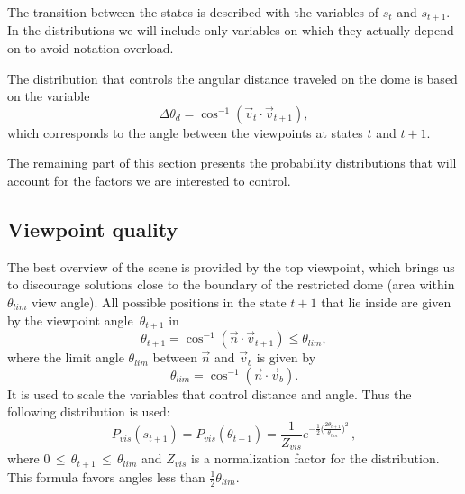 \documentclass[10pt,twocolumn,letterpaper]{article}
\begin{document}
The transition between the states is described with the variables of $s_{t}$ and $s_{t+1}$. 
In the distributions we will include only variables on which they actually depend on to avoid notation overload.

The distribution that controls the angular distance traveled on the dome is based on the variable 
\begin{equation}
  \Delta \theta_{d} = \cos^{-1}(\vec{v}_{t} \cdot \vec{v}_{t+1}),
\end{equation}
which corresponds to the angle between the viewpoints at states $t$ and $t+1$. 

The remaining part of this section presents the probability distributions that will account for the factors we are interested to control.

\subsection{Viewpoint quality}
The best overview of the scene is provided by the top viewpoint, which brings us to discourage solutions close to the boundary of the restricted dome (area within $\theta_{lim}$ view angle).
All possible positions in the state $t+1$ that lie inside are given by the viewpoint angle~$\theta_{t+1}$ in
\begin{equation}
  \theta_{t+1}=\cos^{-1}(\vec{n} \cdot \vec{v}_{t+1}) \leq \theta_{lim},
\end{equation}
where the limit angle $\theta_{lim}$ between $\vec{n}$ and $\vec{v}_{b}$ is given by 
\begin{equation}
  \theta_{lim} = \cos^{-1}(\vec{n} \cdot \vec{v}_{b}).
\end{equation}
It is used to scale the variables that control distance and angle. 
Thus the following distribution is used:
\begin{equation}
  P_{vis}(s_{t+1}) = P_{vis}(\theta_{t+1} ) = 
    \frac{1}{Z_{vis}} e^{ -\frac{1}{2} \big(\frac{2\theta_{t+1}}{\theta_{lim}} \big)^2}\,,
\end{equation}
where $ 0\,\leq\, \theta_{t+1} \,\leq\, \theta_{lim}$ and $Z_{vis}$ is a normalization factor for the distribution. 
This formula favors angles less than $\frac{1}{2}\theta_{lim}$.  

\end{document}

